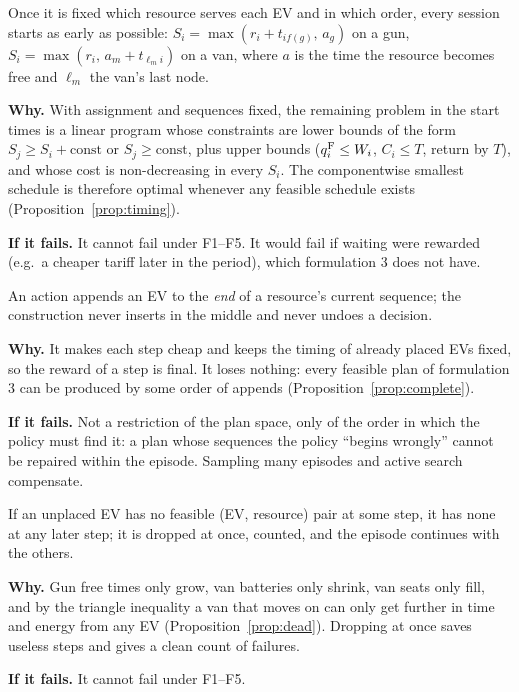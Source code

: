 \begin{assumption}\label{as:timing}
Once it is fixed which resource serves each EV and in which order, every session starts as early as possible: $S_i=\max(r_i+t_{if(g)},\,a_g)$ on a gun, $S_i=\max(r_i,\,a_m+t_{\ell_m i})$ on a van, where $a$ is the time the resource becomes free and $\ell_m$ the van's last node.

\textbf{Why.} With assignment and sequences fixed, the remaining problem in the start times is a linear program whose constraints are lower bounds of the form $S_j\ge S_i+\text{const}$ or $S_j\ge\text{const}$, plus upper bounds ($q^{\mathrm{F}}_i\le W_i$, $C_i\le T$, return by $T$), and whose cost is non-decreasing in every $S_i$. The componentwise smallest schedule is therefore optimal whenever any feasible schedule exists (Proposition~\ref{prop:timing}).

\textbf{If it fails.} It cannot fail under F1--F5. It would fail if waiting were rewarded (e.g.\ a cheaper tariff later in the period), which formulation 3 does not have.
\end{assumption}

\begin{assumption}\label{as:append}
An action appends an EV to the \emph{end} of a resource's current sequence; the construction never inserts in the middle and never undoes a decision.

\textbf{Why.} It makes each step cheap and keeps the timing of already placed EVs fixed, so the reward of a step is final. It loses nothing: every feasible plan of formulation 3 can be produced by some order of appends (Proposition~\ref{prop:complete}).

\textbf{If it fails.} Not a restriction of the plan space, only of the order in which the policy must find it: a plan whose sequences the policy ``begins wrongly'' cannot be repaired within the episode. Sampling many episodes and active search compensate.
\end{assumption}

\begin{assumption}\label{as:dead}
If an unplaced EV has no feasible (EV, resource) pair at some step, it has none at any later step; it is dropped at once, counted, and the episode continues with the others.

\textbf{Why.} Gun free times only grow, van batteries only shrink, van seats only fill, and by the triangle inequality a van that moves on can only get further in time and energy from any EV (Proposition~\ref{prop:dead}). Dropping at once saves useless steps and gives a clean count of failures.

\textbf{If it fails.} It cannot fail under F1--F5.
\end{assumption}

